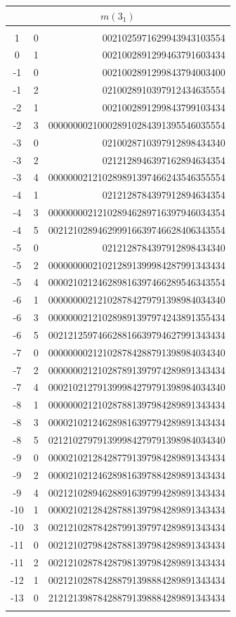 \documentclass{article}
\begin{document}
\begin{supertabular}[h]{c c r}
\hline
{}                     \\
\hline \\[-3pt]
1     & 0  & 0021025971629943943103554             \\
0     & 1  & 0021002891299463791603434             \\
-1    & 0  & 0021002891299843794003400             \\
-1    & 2  & 0210028910397912434635554             \\
-2    & 1  & 0021002891299843799103434             \\
-2    & 3  & 000000002100028910284391395546035554  \\
-3    & 0  & 0210028710397912898434340             \\
-3    & 2  & 0212128946397162894634354             \\
-3    & 4  & 000000021210289891397466243546355554  \\
-4    & 1  & 0212128784397912894634354             \\
-4    & 3  & 000000002121028946289716397946034354  \\
-4    & 5  & 002121028946299916639746628406343554  \\
-5    & 0  & 0212128784397912898434340             \\
-5    & 2  & 000000000210212891399984287991343434  \\
-5    & 4  & 000021021246289816397466289546343554  \\
-6    & 1  & 000000002121028784279791398984034340  \\
-6    & 3  & 000000021210289891397974243891355434  \\
-6    & 5  & 002121259746628816639794627991343434  \\
-7    & 0  & 000000002121028784288791398984034340  \\
-7    & 2  & 000000021210287891397974289891343434  \\
-7    & 4  & 000210212791399984279791398984034340  \\
-8    & 1  & 000000021210287881397984289891343434  \\
-8    & 3  & 000021021246289816397794289891343434  \\
-8    & 5  & 021210279791399984279791398984034340  \\
-9    & 0  & 000021021284287791397984289891343434  \\
-9    & 2  & 000021021246289816397884289891343434  \\
-9    & 4  & 002121028946288916397994289891343434  \\
-10   & 1  & 000021021284287881397984289891343434  \\
-10   & 3  & 002121028784287991397974289891343434  \\
-11   & 0  & 002121027984287881397984289891343434  \\
-11   & 2  & 002121028784287981397984289891343434  \\
-12   & 1  & 002121028784288791398884289891343434  \\
-13   & 0  & 212121398784288791398884289891343434  \\
\\[-5pt]



\end{supertabular}
\end{document}
